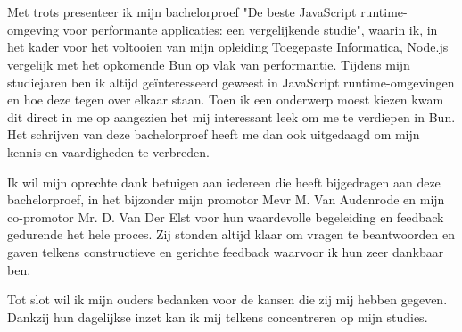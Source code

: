 
\chapter*{}%
\label{ch:voorwoord}


Met trots presenteer ik mijn bachelorproef "De beste JavaScript runtime-omgeving voor performante applicaties: een vergelijkende studie", 
waarin ik, in het kader voor het voltooien van mijn opleiding Toegepaste Informatica, Node.js vergelijk met het opkomende Bun op vlak van performantie.
Tijdens mijn studiejaren ben ik altijd geïnteresseerd geweest in JavaScript runtime-omgevingen en
hoe deze tegen over elkaar staan. Toen ik een onderwerp moest kiezen kwam dit direct in me op aangezien het mij interessant leek om me te verdiepen 
in Bun. Het schrijven van deze bachelorproef heeft me dan ook uitgedaagd om mijn kennis en vaardigheden te verbreden.
\vspace{5mm}

Ik wil mijn oprechte dank betuigen aan iedereen die heeft bijgedragen aan deze bachelorproef, 
in het bijzonder mijn promotor Mevr M. Van Audenrode en mijn co-promotor Mr. D. Van Der Elst voor hun
waardevolle begeleiding en feedback gedurende het hele proces. 
Zij stonden altijd klaar om vragen te beantwoorden en gaven telkens constructieve en gerichte feedback waarvoor ik hun zeer dankbaar ben.
\vspace{5mm}

Tot slot wil ik mijn ouders bedanken voor de kansen die zij mij hebben gegeven. 
Dankzij hun dagelijkse inzet kan ik mij telkens concentreren op mijn studies.


